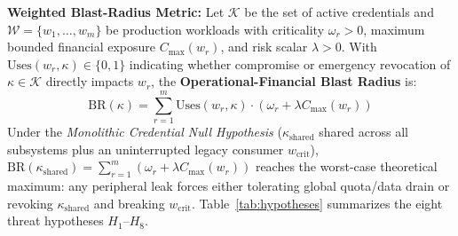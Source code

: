 \documentclass[10pt,twocolumn]{article}
\begin{document}
\textbf{Weighted Blast-Radius Metric:} Let $\mathcal{K}$ be the set of active credentials and $\mathcal{W} = \{w_1, \dots, w_m\}$ be production workloads with criticality $\omega_r > 0$, maximum bounded financial exposure $C_{\max}(w_r)$, and risk scalar $\lambda > 0$. With $\mathrm{Uses}(w_r, \kappa) \in \{0, 1\}$ indicating whether compromise or emergency revocation of $\kappa \in \mathcal{K}$ directly impacts $w_r$, the \textbf{Operational-Financial Blast Radius} is:
\begin{equation}
\mathrm{BR}(\kappa) = \sum_{r=1}^{m} \mathrm{Uses}(w_r, \kappa) \cdot \left(\omega_r + \lambda C_{\max}(w_r)\right)
\end{equation}
Under the \emph{Monolithic Credential Null Hypothesis} ($\kappa_{\mathrm{shared}}$ shared across all subsystems plus an uninterrupted legacy consumer $w_{\mathrm{crit}}$), $\mathrm{BR}(\kappa_{\mathrm{shared}}) = \sum_{r=1}^{m} (\omega_r + \lambda C_{\max}(w_r))$ reaches the worst-case theoretical maximum: any peripheral leak forces either tolerating global quota/data drain or revoking $\kappa_{\mathrm{shared}}$ and breaking $w_{\mathrm{crit}}$. Table~\ref{tab:hypotheses} summarizes the eight threat hypotheses $H_1$--$H_8$.
\end{document}
